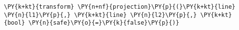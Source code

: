 \begin{Verbatim}[commandchars=\\\{\}]
    \PY{k+kt}{transform} \PY{n+nf}{projection}\PY{p}{(}\PY{k+kt}{line} \PY{n}{l1}\PY{p}{,} \PY{k+kt}{line} \PY{n}{l2}\PY{p}{,} \PY{k+kt}{bool} \PY{n}{safe}\PY{o}{=}\PY{k}{false}\PY{p}{)}
\end{Verbatim}
